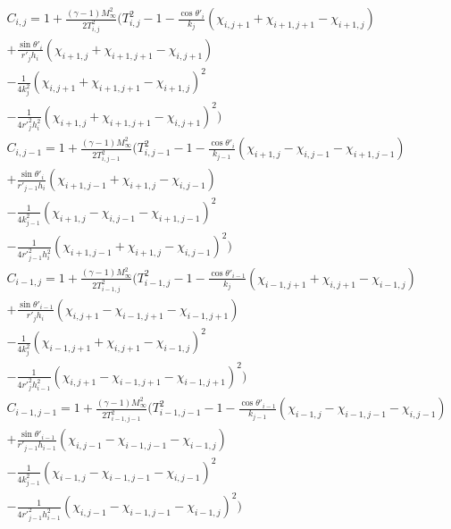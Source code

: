 \documentclass[a4paper]{article}
\begin{document}
	\begin{equation}
		\begin{split}
		C_{i,j} = 1 + \frac{(\gamma-1)M_\infty^2}{2T_{i,j}^2}
		\Biggl(
			T_{i,j}^2 - 1
			- \frac{\cos \theta '_i}{k_j}( \chi_{i,j+1} + \chi_{i+1,j+1} - \chi_{i+1,j} ) \\
			+ \frac{\sin \theta '_i}{r'_j h_i}( \chi_{i+1,j} + \chi_{i+1,j+1} - \chi_{i,j+1} ) \\
			- \frac{1}{4k_j^2}( \chi_{i,j+1} + \chi_{i+1,j+1} - \chi_{i+1,j} )^2 \\
			- \frac{1}{4r'^2_j h_i^2}( \chi_{i+1,j} + \chi_{i+1,j+1} - \chi_{i,j+1} )^2
		\Biggr) \\
		C_{i,j-1} = 1 + \frac{(\gamma-1)M_\infty^2}{2T_{i,j-1}^2}
		\Biggl(
			T_{i,j-1}^2 - 1
			- \frac{\cos \theta '_i}{k_{j-1}}( \chi_{i+1,j} - \chi_{i,j-1} - \chi_{i+1,j-1} ) \\
			+ \frac{\sin \theta '_i}{r'_{j-1} h_i}( \chi_{i+1,j-1} + \chi_{i+1,j} - \chi_{i,j-1} ) \\
			- \frac{1}{4k_{j-1}^2}( \chi_{i+1,j} - \chi_{i,j-1} - \chi_{i+1,j-1} )^2 \\
			- \frac{1}{4r'^2_{j-1} h_i^2}( \chi_{i+1,j-1} + \chi_{i+1,j} - \chi_{i,j-1} )^2
		\Biggr) \\
		C_{i-1,j} = 1 + \frac{(\gamma-1)M_\infty^2}{2T_{i-1,j}^2}
		\Biggl(
			T_{i-1,j}^2 - 1
			- \frac{\cos \theta '_{i-1}}{k_j}( \chi_{i-1,j+1} + \chi_{i,j+1} - \chi_{i-1,j} ) \\
			+ \frac{\sin \theta '_{i-1}}{r'_j h_i}( \chi_{i,j+1} - \chi_{i-1,j+1} - \chi_{i-1,j+1} ) \\
			- \frac{1}{4k_j^2}( \chi_{i-1,j+1} + \chi_{i,j+1} - \chi_{i-1,j} )^2 \\
			- \frac{1}{4r'^2_j h_{i-1}^2}( \chi_{i,j+1} - \chi_{i-1,j+1} - \chi_{i-1,j+1} )^2
		\Biggr) \\
		C_{i-1,j-1} = 1 + \frac{(\gamma-1)M_\infty^2}{2T_{i-1,j-1}^2}
		\Biggl(
			T_{i-1,j-1}^2 - 1
			- \frac{\cos \theta '_{i-1}}{k_{j-1}}( \chi_{i-1,j} - \chi_{i-1,j-1} - \chi_{i,j-1} ) \\
			+ \frac{\sin \theta '_{i-1}}{r'_{j-1} h_{i-1}}( \chi_{i,j-1} - \chi_{i-1,j-1} - \chi_{i-1,j} ) \\
			- \frac{1}{4k_{j-1}^2}( \chi_{i-1,j} - \chi_{i-1,j-1} - \chi_{i,j-1} )^2 \\
			- \frac{1}{4r'^2_{j-1} h_{i-1}^2}( \chi_{i,j-1} - \chi_{i-1,j-1} - \chi_{i-1,j} )^2
		\Biggr) \\
		\end{split}
	\end{equation}
	
\end{document}
